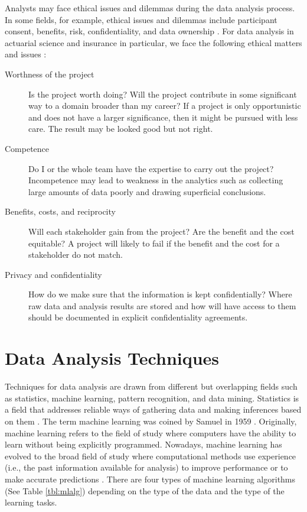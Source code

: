 \documentclass[12pt]{article}
\begin{document}
Analysts may face ethical issues and dilemmas during the data analysis process. In some fields, for example, ethical issues and dilemmas include participant consent, benefits, risk, confidentiality, and data ownership \citep{miles2014}. For data analysis in actuarial science and insurance in particular, we face the following ethical matters and issues \citep{miles2014}:
\begin{description}
\item[Worthness of the project] Is the project worth doing? Will the project contribute in some significant way to a domain broader than my career? If a project is only opportunistic and does not have a larger significance, then it might be pursued with less care. The result may be looked good but not right.
\item[Competence] Do I or the whole team have the expertise to carry out the project? Incompetence may lead to weakness in the analytics such as collecting large amounts of data poorly and drawing superficial conclusions.
\item[Benefits, costs, and reciprocity] Will each stakeholder gain from the project? Are the benefit and the cost equitable? A project will likely to fail if the benefit and the cost for a stakeholder do not match.
\item[Privacy and confidentiality] How do we make sure that the information is kept confidentially? Where raw data and analysis results are stored and how will have access to them should be documented in explicit confidentiality agreements. 

\end{description}



\section{Data Analysis Techniques}


Techniques for data analysis are drawn from different but overlapping fields such as statistics, machine learning, pattern recognition, and data mining. Statistics is a field that addresses reliable ways of gathering data and making inferences based on them \citep{bandyo2011,bluman2012}. The term machine learning was coined by Samuel in 1959 \citep{samuel1959ml}. Originally, machine learning refers to the field of study where computers have the ability to learn without being explicitly programmed. Nowadays, machine learning has evolved to the broad field of study where computational methods use experience (i.e., the past information available for analysis) to improve performance or to make accurate predictions \citep{bishop2007,clarke2009,mohri2012,kubat2017}. There are four types of machine learning algorithms (See Table \ref{tbl:mlalg}) depending on the type of the data and the type of the learning tasks.
\end{document}
